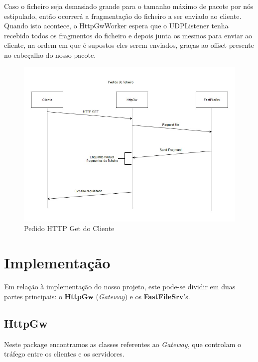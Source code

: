 \documentclass[11pt]{article}
\begin{document}
\par Caso o ficheiro seja demasiado grande para o tamanho máximo de pacote por nós estipulado, então ocorrerá a fragmentação do ficheiro a ser enviado ao cliente. Quando isto acontece, o HttpGwWorker espera que o UDPListener tenha recebido todos os fragmentos do ficheiro e depois junta os mesmos para enviar ao cliente, na ordem em que é supostos eles serem enviados, graças ao offset presente no cabeçalho do nosso pacote.


\begin{figure}[!ht]
    \centering
    \includegraphics[scale=0.8]{images/FileRequest.jpg}
    \caption{Pedido HTTP Get do Cliente}
    \label{fig:request}
\end{figure}


\cleardoublepage
\section{Implementação}

Em relação à implementação do nosso projeto, este pode-se dividir em duas partes principais: o \textbf{HttpGw} (\textit{Gateway}) e os \textbf{FastFileSrv}'s.

\subsection{HttpGw}

Neste package encontramos as classes referentes ao \textit{Gateway}, que controlam o tráfego entre os clientes e os servidores.
\end{document}
